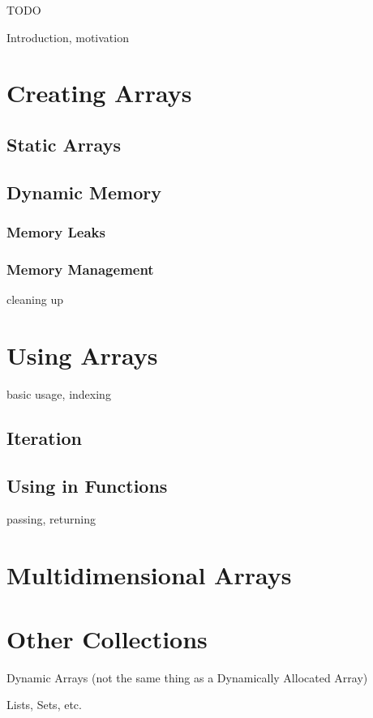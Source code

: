 

TODO

Introduction, motivation

\section{Creating Arrays}

\subsection{Static Arrays}

\subsection{Dynamic Memory}

\subsubsection{Memory Leaks}

\subsubsection{Memory Management}

cleaning up 

\section{Using Arrays}

basic usage, indexing

\subsection{Iteration}

\subsection{Using in Functions}

passing, returning

\section{Multidimensional Arrays}

\section{Other Collections}

Dynamic Arrays (not the same thing as a Dynamically Allocated Array)

Lists, Sets, etc.


